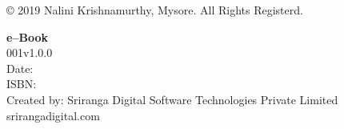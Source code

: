 \thispagestyle{empty}

© 2019 Nalini Krishnamurthy, Mysore. All Rights Registerd.

 \textbf{e–Book}\\
 001v1.0.0\\
 Date: \\
 ISBN: \\
 Created by: Sriranga Digital Software Technologies Private Limited\\srirangadigital.com

